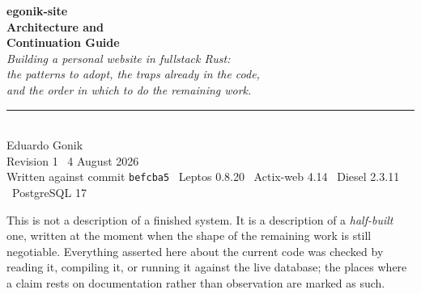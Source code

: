 \documentclass[11pt,openany]{report}
\begin{document}
\begin{titlepage}
\thispagestyle{empty}
\raggedright
\vspace*{0.10\textheight}


\vspace{14mm}
{\color{rust}\sffamily\bfseries\large egonik-site}\\[3mm]
{\color{ink}\fontsize{31}{36}\selectfont\bfseries Architecture and\\ Continuation Guide}\\[6mm]
{\color{slate}\fontsize{13.5}{18}\selectfont\itshape Building a personal website in fullstack Rust:\\
the patterns to adopt, the traps already in the code,\\ and the order in which to do the remaining work.}

\vspace{16mm}
{\color{rule}\rule{\textwidth}{1pt}}\\[4mm]
{\sffamily\small\color{slate}
Eduardo Gonik \\[2mm]
Revision 1 \textperiodcentered\ 4 August 2026 \\[2mm]
Written against commit \texttt{befcba5} \textperiodcentered\ Leptos 0.8.20 \textperiodcentered\ Actix-web 4.14 \textperiodcentered\ Diesel 2.3.11 \textperiodcentered\ PostgreSQL 17}

\vfill
\begin{keyidea}
\normalfont\small
This is not a description of a finished system. It is a description of a \emph{half-built} one, written
at the moment when the shape of the remaining work is still negotiable. Everything asserted here about the
current code was checked by reading it, compiling it, or running it against the live database; the places
where a claim rests on documentation rather than observation are marked as such.
\end{keyidea}
\end{titlepage}
\end{document}
